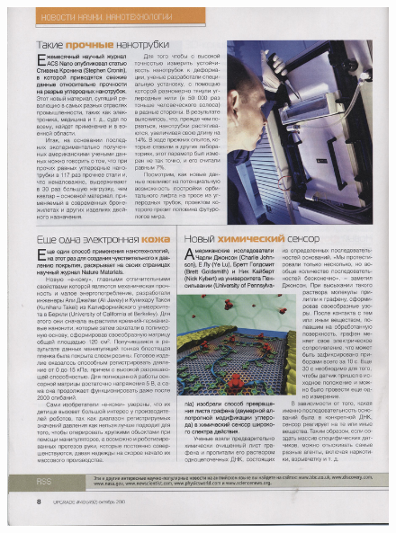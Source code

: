 \documentclass{book}
\begin{document}
\begin{figure}[H]
\begin{center}
\includegraphics[scale=0.2]{images/5.jpg}

\end{center}
\end{figure}
\end{document}
